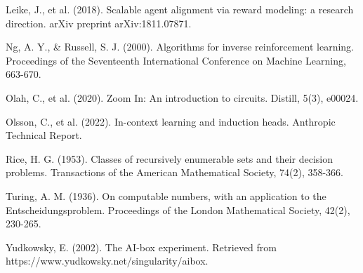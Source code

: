 \documentclass[11pt]{article}
\begin{document}
\begin{thebibliography}{99}
Leike, J., et al. (2018). Scalable agent alignment via reward modeling: a research direction. arXiv preprint arXiv:1811.07871.

Ng, A. Y., \& Russell, S. J. (2000). Algorithms for inverse reinforcement learning. Proceedings of the Seventeenth International Conference on Machine Learning, 663-670.

Olah, C., et al. (2020). Zoom In: An introduction to circuits. Distill, 5(3), e00024.

Olsson, C., et al. (2022). In-context learning and induction heads. Anthropic Technical Report.

Rice, H. G. (1953). Classes of recursively enumerable sets and their decision problems. Transactions of the American Mathematical Society, 74(2), 358-366.

Turing, A. M. (1936). On computable numbers, with an application to the Entscheidungsproblem. Proceedings of the London Mathematical Society, 42(2), 230-265.

Yudkowsky, E. (2002). The AI-box experiment. Retrieved from https://www.yudkowsky.net/singularity/aibox.
\end{thebibliography}
\end{document}
